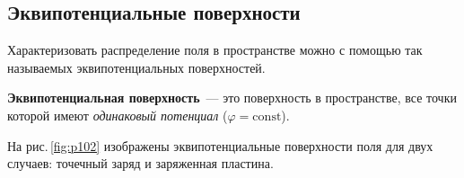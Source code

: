\documentclass[main.tex]{subfiles}
\begin{document}

\pagestyle{empty}

\begin{NoHyper} %

\setcounter{section}{9
}
\addtocounter{section}{-1} 

\section{Эквипотенциальные поверхности}


Характеризовать распределение поля в пространстве можно с помощью так называемых эквипотенциальных поверхностей.  

\textbf{Эквипотенциальная поверхность}~--- это поверхность в пространстве, все точки которой имеют \emph{одинаковый потенциал} ($\varphi=\mathrm{const}$). 

На рис.\,\ref{fig:p102} изображены эквипотенциальные поверхности поля для двух случаев: точечный заряд и заряженная пластина.

    \begin{figure}[H]
    \centering

\end{figure}
\end{NoHyper}
\end{document}
